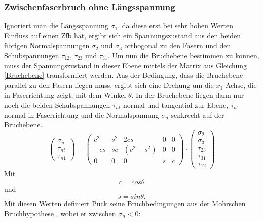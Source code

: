 \subsubsection{Zwischenfaserbruch ohne Längsspannung}
Ignoriert man die Längsspannung $\sigma_1$, da diese erst bei sehr hohen Werten Einfluss auf einen Zfb hat, ergibt sich ein Spannungszustand aus den beiden übrigen Normalspannungen $\sigma_2$ und $\sigma_3$ orthogonal zu den Fasern und den Schubspannungen $\tau_{12}$, $\tau_{23}$ und $\tau_{31}$. Um nun die Bruchebene bestimmen zu können, muss der Spannungszustand in dieser Ebene mittels der Matrix aus Gleichung \ref{Bruchebene} transformiert werden. Aus der Bedingung, dass die Bruchebene parallel zu den Fasern liegen muss, ergibt sich eine Drehung um die $x_1$-Achse, die in Faserrichtung zeigt, mit dem Winkel $\theta$. In der Bruchebene liegen dann nur noch die beiden Schubspannungen $\tau_{nt}$ normal und tangential zur Ebene, $\tau_{n1}$ normal in Faserrichtung und die Normalspannung $\sigma_n$ senkrecht auf der Bruchebene.
\begin{equation}\label{Bruchebene}
	\begin{pmatrix}
		\sigma_n \\ \tau_{nt} \\ \tau_{n1}
	\end{pmatrix}
	=
	\begin{pmatrix}
		c^2 & s^2 & 2cs & 0 & 0\\
		-cs & sc & (c^2-s^2) & 0 & 0\\
		0 & 0 & 0 & s & c
	\end{pmatrix}
	\cdot
	\begin{pmatrix}
		\sigma_2 \\ \sigma_3 \\ \tau_{23} \\ \tau_{31} \\ \tau_{12}
	\end{pmatrix}
\end{equation}
Mit
\begin{equation}
	c = cos\theta
\end{equation}
und
\begin{equation}
	s = sin\theta.
\end{equation}
Mit diesen Werten definiert Puck seine Bruchbedingungen aus der Mohrschen Bruchhypothese \cite{item3}, wobei er zwischen $\sigma_n < 0$:
